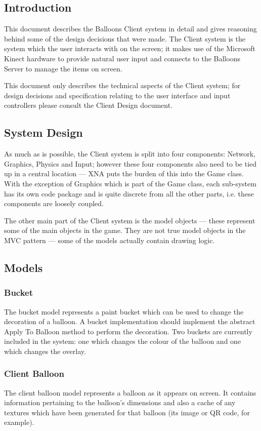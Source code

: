 \subsection{Introduction}
This document describes the Balloons Client system in detail and gives 
reasoning behind some of the design decisions that were made. The Client system
is the system which the user interacts with on the screen; it makes use of the
Microsoft Kinect hardware to provide natural user input and connects to the 
Balloons Server to manage the items on screen. 

This document only describes the technical aspects of the Client system; for 
design decisions and specification relating to the user interface and input 
controllers please consult the Client Design document.

\subsection{System Design}
As much as is possible, the Client system is split into four components: 
Network, Graphics, Physics and Input; however these four components also need 
to be tied up in a central location --- XNA puts the burden of this into the Game
class. With the exception of Graphics which is part of the Game class, each
sub-system has its own code package and is quite discrete from all the other 
parts, i.e. these components are loosely coupled.

The other main part of the Client system is the model objects --- these represent
some of the main objects in the game. They are not true model objects in the
MVC pattern --- some of the models actually contain drawing logic.

\subsection{Models}
\subsubsection{Bucket}
The bucket model represents a paint bucket which can be used to change the 
decoration of a balloon. A bucket implementation should implement the abstract
Apply To Balloon method to perform the decoration. Two buckets are currently
included in the system: one which changes the colour of the balloon and one 
which changes the overlay. 

\subsubsection{Client Balloon}
The client balloon model represents a balloon as it appears on screen. It 
contains information pertaining to the balloon's dimensions and also a cache of
any textures which have been generated for that balloon (its image or QR code, 
for example). 

